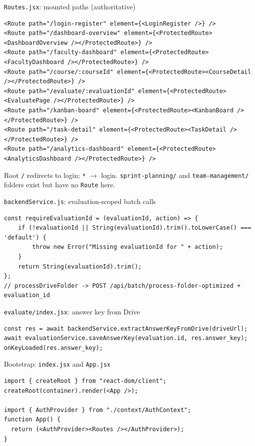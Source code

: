 \documentclass[aspectratio=169]{beamer}
\begin{document}
\begin{frame}[fragile]{\texttt{Routes.jsx}: mounted paths (authoritative)}
\begin{lstlisting}[style=jsx]
<Route path="/login-register" element={<LoginRegister />} />
<Route path="/dashboard-overview" element={<ProtectedRoute><DashboardOverview /></ProtectedRoute>} />
<Route path="/faculty-dashboard" element={<ProtectedRoute><FacultyDashboard /></ProtectedRoute>} />
<Route path="/course/:courseId" element={<ProtectedRoute><CourseDetail /></ProtectedRoute>} />
<Route path="/evaluate/:evaluationId" element={<ProtectedRoute><EvaluatePage /></ProtectedRoute>} />
<Route path="/kanban-board" element={<ProtectedRoute><KanbanBoard /></ProtectedRoute>} />
<Route path="/task-detail" element={<ProtectedRoute><TaskDetail /></ProtectedRoute>} />
<Route path="/analytics-dashboard" element={<ProtectedRoute><AnalyticsDashboard /></ProtectedRoute>} />
\end{lstlisting}
\vfill
\tiny Root \texttt{/} redirects to login; \texttt{*} $\rightarrow$ login. \texttt{sprint-planning/} and \texttt{team-management/} folders exist but have no \texttt{Route} here.
\end{frame}

\begin{frame}[fragile]{\texttt{backendService.js}: evaluation-scoped batch calls}
\begin{lstlisting}[style=jsx]
const requireEvaluationId = (evaluationId, action) => {
    if (!evaluationId || String(evaluationId).trim().toLowerCase() === 'default') {
        throw new Error("Missing evaluationId for " + action);
    }
    return String(evaluationId).trim();
};
// processDriveFolder -> POST /api/batch/process-folder-optimized + evaluation_id
\end{lstlisting}
\end{frame}

\begin{frame}[fragile]{\texttt{evaluate/index.jsx}: answer key from Drive}
\begin{lstlisting}[style=jsx]
const res = await backendService.extractAnswerKeyFromDrive(driveUrl);
await evaluationService.saveAnswerKey(evaluation.id, res.answer_key);
onKeyLoaded(res.answer_key);
\end{lstlisting}
\end{frame}

\begin{frame}[fragile]{Bootstrap: \texttt{index.jsx} and \texttt{App.jsx}}
\begin{lstlisting}[style=jsx]
import { createRoot } from "react-dom/client";
createRoot(container).render(<App />);

import { AuthProvider } from "./context/AuthContext";
function App() {
  return (<AuthProvider><Routes /></AuthProvider>);
}
\end{lstlisting}
\end{frame}
\end{document}
